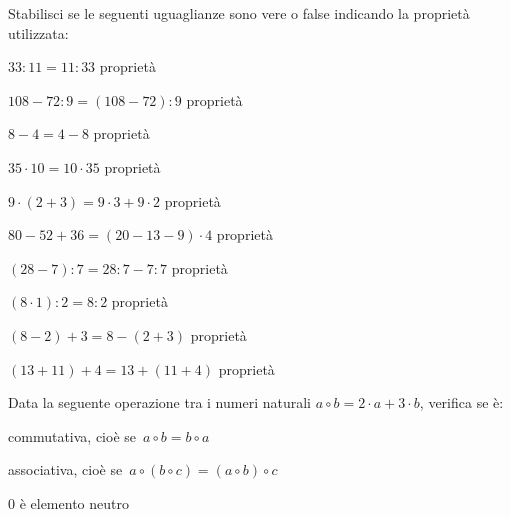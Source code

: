 
\begin{esercizio}
Stabilisci se le seguenti uguaglianze sono vere o false indicando la
proprietà utilizzata:
\TabPositions{5.2cm}
 \begin{enumeratees}
 \item \(33:11=11:33\)	\tab  proprietà\dotfill\enspace\verofalso
 \item \(108-72:9=(108-72):9\)	\tab  proprietà\dotfill\enspace\verofalso
 \item \(8-4=4-8\)	\tab  proprietà\dotfill\enspace\verofalso
 \item \(35\cdot 10=10\cdot 35\)	\tab  
proprietà\dotfill\enspace\verofalso
 \item \(9\cdot(2+3)=9\cdot3+9\cdot2\)	\tab  
proprietà\dotfill\enspace\verofalso
 \item \(80-52+36=(20-13-9)\cdot 4\)	\tab  
proprietà\dotfill\enspace\verofalso
 \item \((28-7):7=28:7-7:7\)	\tab  proprietà\dotfill\enspace\verofalso
 \item \((8\cdot 1):2=8:2\)	\tab  proprietà\dotfill\enspace\verofalso
 \item \((8-2)+3=8-(2+3)\)	\tab  proprietà\dotfill\enspace\verofalso
 \item \((13+11)+4=13+(11+4)\)	\tab  proprietà\dotfill\enspace\verofalso
 \end{enumeratees}
\end{esercizio}

\begin{esercizio}
Data la seguente operazione tra i numeri naturali 
\(a\circ b=2\cdot a +3\cdot 
b\), verifica se è:
 \begin{enumeratees}
 \item commutativa, cioè se~\(a\circ b=b\circ a\)
 \item associativa, cioè se~\(a\circ (b\circ c)=(a\circ b)\circ c\)
 \item 0 è elemento neutro
 \end{enumeratees}
\end{esercizio}

